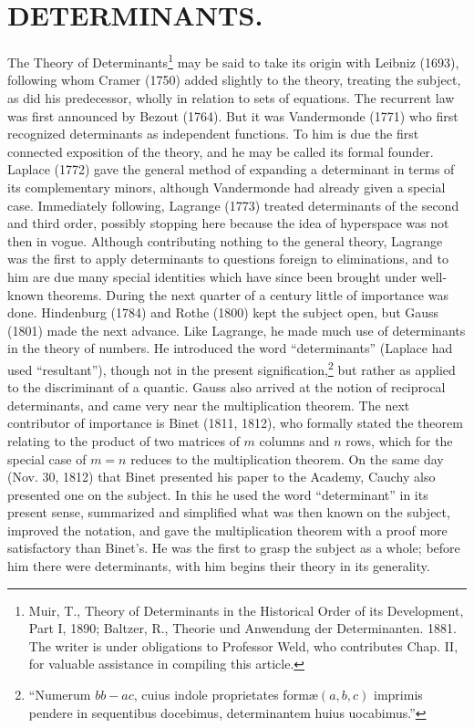 \documentclass[oneside]{book}
\begin{document}
{\chapter{DETERMINANTS.}

The Theory of Determinants\footnote{Muir, T., Theory of Determinants
in the Historical Order of its Development, Part I, 1890; Baltzer,
R., Theorie und Anwendung der Determinanten. 1881. The writer is
under obligations to Professor Weld, who contributes Chap. II, for
valuable assistance in compiling this article.} may be said to take
its origin with Leibniz (1693), following whom Cramer (1750) added
slightly to the theory, treating the subject, as did his
predecessor, wholly in relation to sets of equations. The recurrent
law was first announced by Bezout (1764). But it was Vandermonde
(1771) who first recognized determinants as independent
functions. To him is due the first connected exposition of the
theory, and he may be called its formal founder. Laplace (1772)
gave the general method of expanding a determinant in terms of its
complementary minors, although Vandermonde had already given a
special case. Immediately following, Lagrange (1773) treated
determinants of the second and third order, possibly stopping here
because the idea of hyperspace was not then in vogue. Although
contributing nothing to the general theory, Lagrange was the first
to apply determinants to questions foreign to eliminations, and to
him are due many special identities which have since been brought
under well-known theorems. During the next quarter of a century
little of importance was done. Hindenburg (1784) and Rothe (1800)
kept the subject open, but Gauss (1801) made the next advance. Like
Lagrange, he made much use of determinants in the theory of
numbers. He introduced the word ``determinants'' (Laplace had used
``resultant''), though not in the present
signification,\footnote{``Numerum $bb-ac$, cuius indole
proprietates form\ae $(a, b, c)$ imprimis pendere in sequentibus
docebimus, determinantem huius uocabimus.''} but
rather as applied to the discriminant of a
quantic. Gauss also arrived at the notion of reciprocal
determinants, and came very near the multiplication theorem. The
next contributor of importance is Binet (1811, 1812), who formally
stated the theorem relating to the product of two matrices of $m$
columns and $n$ rows, which for the special case of $m = n$ reduces
to the multiplication theorem. On the same day (Nov. 30, 1812) that
Binet presented his paper to the Academy, Cauchy also presented one
on the subject. In this he used the word ``determinant'' in its
present sense, summarized and simplified what was then known on the
subject, improved the notation, and gave the multiplication theorem
with a proof more satisfactory than Binet's. He was the first to
grasp the subject as a whole; before him there were determinants,
with him begins their theory in its generality.

}
\end{document}
